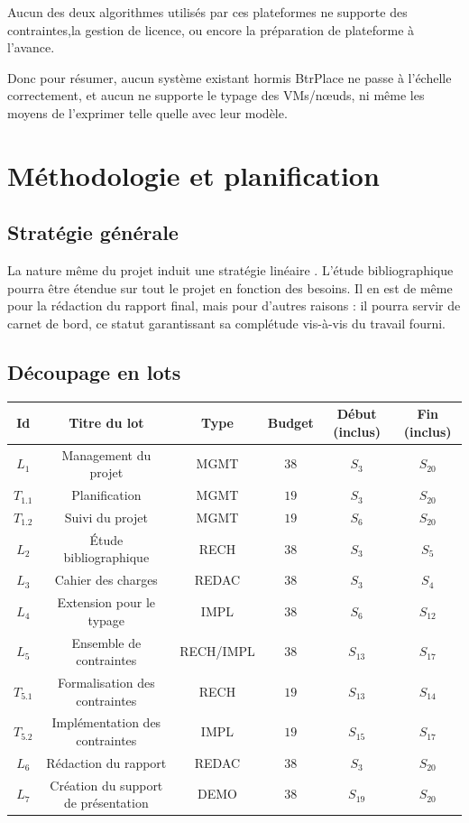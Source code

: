 \documentclass[a4paper]{article}
\begin{document}
Aucun des deux algorithmes utilisés par ces plateformes
ne supporte des contraintes,la gestion de licence, ou encore la
préparation de plateforme à l'avance.

Donc pour résumer, aucun système existant hormis BtrPlace ne passe
à l'échelle correctement, et aucun ne supporte le typage des VMs/nœuds,
ni même les moyens de l'exprimer telle quelle avec leur modèle.

\section{Méthodologie et planification}
\subsection{Stratégie générale}
La nature même du projet induit une stratégie \og linéaire \fg. L'étude
bibliographique pourra être étendue sur tout le projet en fonction
des besoins. Il en est de même pour la rédaction du rapport final, mais
pour d'autres raisons : il pourra servir de carnet de bord, ce
statut garantissant sa complétude vis-à-vis du travail fourni.

\subsection{Découpage en lots}
\begin{center}
\begin{tabular}{c|c|c|c|c|c}
	\textbf{Id} & \textbf{Titre du lot} & \textbf{Type} & \textbf{Budget} & \textbf{Début (inclus)} & \textbf{Fin (inclus)} \\
	\hline
	\hline
	$L_1$ & Management du projet & MGMT & $38$ & $S_3$ & $S_{20}$ \\
	\hline
	$T_{1.1}$ & Planification & MGMT & $19$ & $S_3$ & $S_{20}$ \\
	\hline
	$T_{1.2}$ & Suivi du projet & MGMT & $19$ & $S_6$ & $S_{20}$ \\
	\hline
	$L_2$ & Étude bibliographique & RECH & $38$ & $S_3$ & $S_5$ \\
	\hline
	$L_3$ & Cahier des charges & REDAC & $38$ & $S_3$ & $S_4$ \\
	\hline
	$L_4$ & Extension pour le typage & IMPL & $38$ & $S_6$ & $S_{12}$ \\
	\hline
	$L_5$ & Ensemble de contraintes & RECH/IMPL & $38$ & $S_{13}$ & $S_{17}$ \\
	\hline
	$T_{5.1}$ & Formalisation des contraintes & RECH & $19$ & $S_{13}$ & $S_{14}$ \\
	\hline
	$T_{5.2}$ & Implémentation des contraintes & IMPL & $19$ & $S_{15}$ & $S_{17}$ \\
	\hline
	$L_6$ & Rédaction du rapport & REDAC & $38$ & $S_3$ & $S_{20}$ \\
	\hline
	$L_7$ & Création du support de présentation & DEMO & $38$ & $S_{19}$ & $S_{20}$ \\
\end{tabular}
\end{center}
\end{document}
